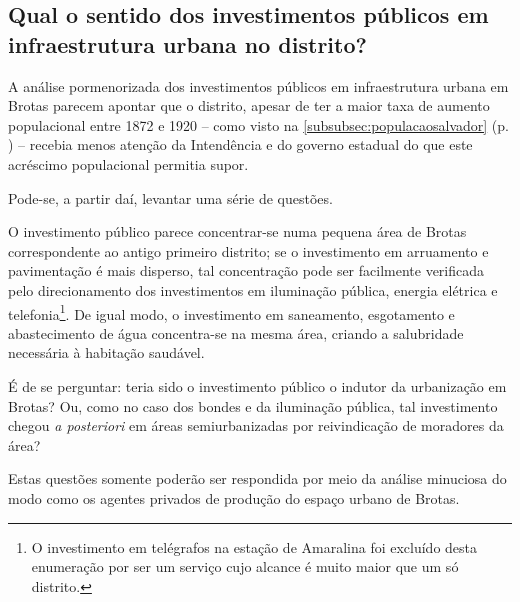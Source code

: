 \subsection{Qual o sentido dos investimentos públicos em infraestrutura urbana no distrito?}

A análise pormenorizada dos investimentos públicos em infraestrutura urbana em Brotas parecem apontar que o distrito, apesar de ter a maior taxa de aumento populacional entre 1872 e 1920 -- como visto na \autoref{subsubsec:populacaosalvador} (p. \pageref{subsubsec:populacaosalvador}) -- recebia menos atenção da Intendência e do governo estadual do que este acréscimo populacional permitia supor.

Pode-se, a partir daí, levantar uma série de questões. 

O investimento público parece concentrar-se numa pequena área de Brotas correspondente ao antigo primeiro distrito; se o investimento em arruamento e pavimentação é mais disperso, tal concentração pode ser facilmente verificada pelo direcionamento dos investimentos em iluminação pública, energia elétrica e telefonia\footnote{O investimento em telégrafos na estação de Amaralina foi excluído desta enumeração por ser um serviço cujo alcance é muito maior que um só distrito.}.  De igual modo, o investimento em saneamento, esgotamento e abastecimento de água concentra-se na mesma área, criando a salubridade necessária à habitação saudável.

É de se perguntar: teria sido o investimento público o indutor da urbanização em Brotas? Ou, como no caso dos bondes e da iluminação pública, tal investimento chegou \textit{a posteriori} em áreas semiurbanizadas por reivindicação de moradores da área?

Estas questões somente poderão ser respondida por meio da análise minuciosa do modo como os agentes privados de produção do espaço urbano de Brotas.